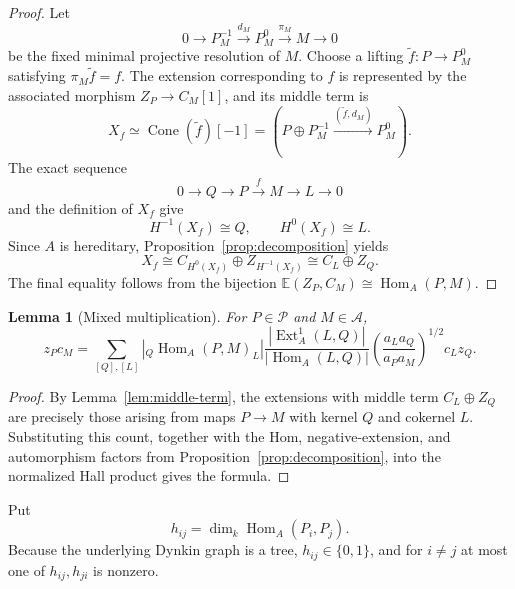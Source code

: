 \documentclass[12pt]{article}
\newcommand{\cA}{\mathcal A}
\newcommand{\cP}{\mathscr P}
\newcommand{\EE}{\mathbb E}
\newcommand{\Hom}{\operatorname{Hom}}
\newcommand{\Ext}{\operatorname{Ext}}
\theoremstyle{plain}
\newtheorem{lemma}[theorem]{Lemma}
\theoremstyle{remark}
\begin{document}
\begin{proof}
Let
\[
 0\longrightarrow P_M^{-1}\xrightarrow{d_M}P_M^0
 \xrightarrow{\pi_M}M\longrightarrow0
\]
be the fixed minimal projective resolution of $M$. Choose a lifting
$\widetilde f:P\to P_M^0$ satisfying $\pi_M\widetilde f=f$. The extension
corresponding to $f$ is represented by the associated morphism
$Z_P\to C_M[1]$, and its middle term is
\[
 X_f\simeq\operatorname{Cone}(\widetilde f)[-1]
 =\left(P\oplus P_M^{-1}
 \xrightarrow{(\widetilde f,d_M)}P_M^0\right).
\]
The exact sequence
\[
 0\longrightarrow Q\longrightarrow P\xrightarrow{f}M
 \longrightarrow L\longrightarrow0
\]
and the definition of $X_f$ give
\[
 H^{-1}(X_f)\cong Q,
 \qquad
 H^0(X_f)\cong L.
\]
Since $A$ is hereditary, Proposition~\ref{prop:decomposition} yields
\[
 X_f\cong C_{H^0(X_f)}\oplus Z_{H^{-1}(X_f)}
 \cong C_L\oplus Z_Q.
\]
The final equality follows from the bijection
$\EE(Z_P,C_M)\cong\Hom_A(P,M)$.
\end{proof}

\begin{lemma}[Mixed multiplication]\label{lem:mixed}
For $P\in\cP$ and $M\in\cA$,
\[
 z_Pc_M=
 \sum_{[Q],[L]}
 |{}_Q\Hom_A(P,M)_L|
 \frac{|\Ext_A^1(L,Q)|}{|\Hom_A(L,Q)|}
 \left(\frac{a_La_Q}{a_Pa_M}\right)^{1/2}
 c_Lz_Q.
\]
\end{lemma}

\begin{proof}
By Lemma~\ref{lem:middle-term}, the extensions with middle term
$C_L\oplus Z_Q$ are precisely those arising from maps $P\to M$ with kernel
$Q$ and cokernel $L$. Substituting this count, together with the Hom,
negative-extension, and automorphism factors from
Proposition~\ref{prop:decomposition}, into the normalized Hall product gives
the formula.
\end{proof}

Put
\[
 h_{ij}=\dim_k\Hom_A(P_i,P_j).
\]
Because the underlying Dynkin graph is a tree, $h_{ij}\in\{0,1\}$, and for
$i\ne j$ at most one of $h_{ij},h_{ji}$ is nonzero.
\end{document}
